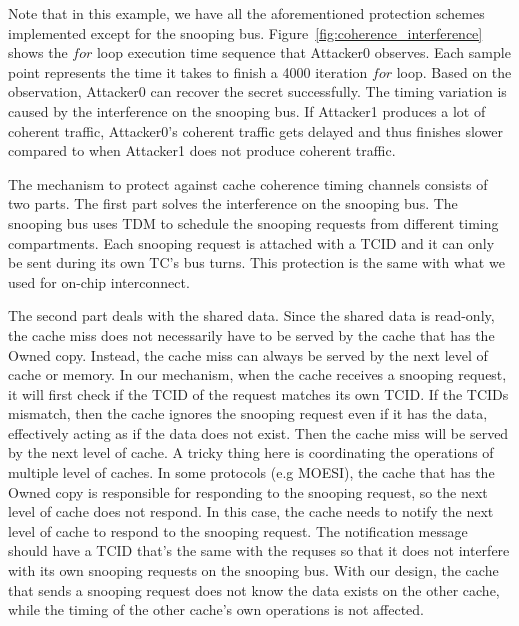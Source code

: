 Note that in this example, we have all the aforementioned protection schemes implemented except for the snooping bus.
Figure~\ref{fig:coherence_interference} shows the $for$ loop execution time sequence that Attacker0 observes. Each
sample point represents the time it takes to finish a 4000 iteration $for$ loop. Based on the observation, Attacker0
can recover the secret successfully. The timing variation is caused by the interference on the snooping bus. If Attacker1
produces a lot of coherent traffic, Attacker0's coherent traffic gets delayed and thus finishes slower compared to
when Attacker1 does not produce coherent traffic. 

The mechanism to protect against cache coherence timing channels consists of two parts. The first part solves the 
interference on the snooping bus. The snooping bus uses TDM to schedule the snooping requests from different timing
compartments. Each snooping request is attached with a TCID and it can only be sent during its own TC's bus turns.
This protection is the same with what we used for on-chip interconnect. 

The second part deals
with the shared data. Since the shared data is read-only, the cache miss does not necessarily have to be served by
the cache that has the Owned copy. Instead, the cache miss can always be served by the next level of cache or memory.
In our mechanism, when the cache receives a snooping request, it will first check if the TCID of the request matches its
own TCID. If the TCIDs mismatch, then the cache ignores the snooping request even if it has the data, effectively acting
as if the data does not exist. Then the cache miss will be served by the next level of cache. A tricky thing here is
coordinating the operations of multiple level of caches. In some protocols (e.g MOESI), the cache that has the Owned copy
is responsible for responding to the snooping request, so the next level of cache does not respond. In this case, the
cache needs to notify the next level of cache to respond to the snooping request. The notification message should
have a TCID that's the same with the requses so that it does not interfere with its own snooping requests on the snooping 
bus. With our design, the cache that sends a snooping request does not know the data exists on the other cache, while
the timing of the other cache's own operations is not affected.
 

